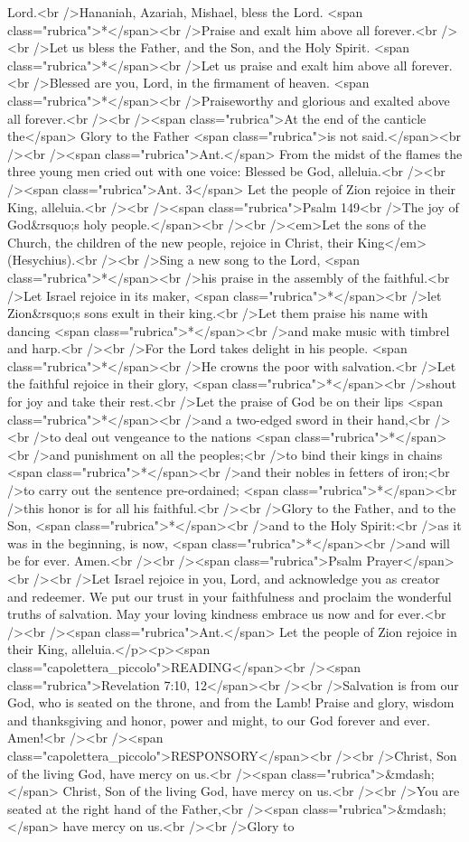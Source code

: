 Lord.<br />Hananiah, Azariah, Mishael, bless the Lord. <span class="rubrica">*</span><br />Praise and exalt him above all forever.<br /><br />Let us bless the Father, and the Son, and the Holy Spirit. <span class="rubrica">*</span><br />Let us praise and exalt him above all forever.<br />Blessed are you, Lord, in the firmament of heaven. <span class="rubrica">*</span><br />Praiseworthy and glorious and exalted above all forever.<br /><br /><span class="rubrica">At the end of the canticle the</span> Glory to the Father <span class="rubrica">is not said.</span><br /><br /><span class="rubrica">Ant.</span> From the midst of the flames the three young men cried out with one voice: Blessed be God, alleluia.<br /><br /><span class="rubrica">Ant. 3</span> Let the people of Zion rejoice in their King, alleluia.<br /><br /><span class="rubrica">Psalm 149<br />The joy of God&rsquo;s holy people.</span><br /><br /><em>Let the sons of the Church, the children of the new people, rejoice in Christ, their King</em> (Hesychius).<br /><br />Sing a new song to the Lord, <span class="rubrica">*</span><br />his praise in the assembly of the faithful.<br />Let Israel rejoice in its maker, <span class="rubrica">*</span><br />let Zion&rsquo;s sons exult in their king.<br />Let them praise his name with dancing <span class="rubrica">*</span><br />and make music with timbrel and harp.<br /><br />For the Lord takes delight in his people. <span class="rubrica">*</span><br />He crowns the poor with salvation.<br />Let the faithful rejoice in their glory, <span class="rubrica">*</span><br />shout for joy and take their rest.<br />Let the praise of God be on their lips <span class="rubrica">*</span><br />and a two-edged sword in their hand,<br /><br />to deal out vengeance to the nations <span class="rubrica">*</span><br />and punishment on all the peoples;<br />to bind their kings in chains <span class="rubrica">*</span><br />and their nobles in fetters of iron;<br />to carry out the sentence pre-ordained; <span class="rubrica">*</span><br />this honor is for all his faithful.<br /><br />Glory to the Father, and to the Son, <span class="rubrica">*</span><br />and to the Holy Spirit:<br />as it was in the beginning, is now, <span class="rubrica">*</span><br />and will be for ever. Amen.<br /><br /><span class="rubrica">Psalm Prayer</span><br /><br />Let Israel rejoice in you, Lord, and acknowledge you as creator and redeemer. We put our trust in your faithfulness and proclaim the wonderful truths of salvation. May your loving kindness embrace us now and for ever.<br /><br /><span class="rubrica">Ant.</span> Let the people of Zion rejoice in their King, alleluia.</p><p><span class="capolettera_piccolo">READING</span><br /><span class="rubrica">Revelation 7:10, 12</span><br /><br />Salvation is from our God, who is seated on the throne, and from the Lamb! Praise and glory, wisdom and thanksgiving and honor, power and might, to our God forever and ever. Amen!<br /><br /><span class="capolettera_piccolo">RESPONSORY</span><br /><br />Christ, Son of the living God, have mercy on us.<br /><span class="rubrica">&mdash;</span> Christ, Son of the living God, have mercy on us.<br /><br />You are seated at the right hand of the Father,<br /><span class="rubrica">&mdash;</span> have mercy on us.<br /><br />Glory to 